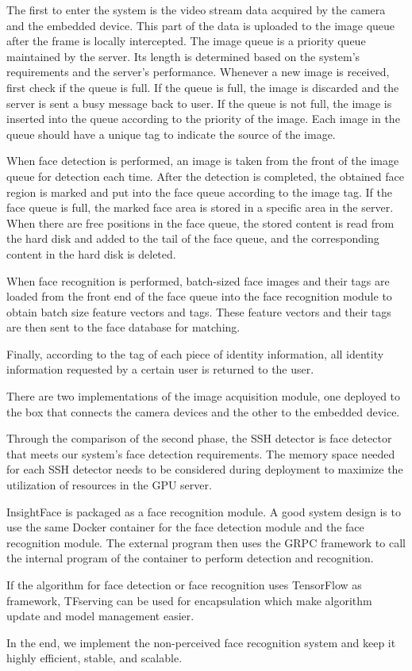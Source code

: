 \begin{bigabstract}
The first to enter the system is the video stream data acquired by the camera and the embedded device. This part of the data is uploaded to the image queue after the frame is locally intercepted. The image queue is a priority queue maintained by the server. Its length is determined based on the system's requirements and the server's performance. Whenever a new image is received, first check if the queue is full. If the queue is full, the image is discarded and the server is sent a busy message back to user. If the queue is not full, the image is inserted into the queue according to the priority of the image. Each image in the queue should have a unique tag to indicate the source of the image.

When face detection is performed, an image is taken from the front of the image queue for detection each time. After the detection is completed, the obtained face region is marked and put into the face queue according to the image tag. If the face queue is full, the marked face area is stored in a specific area in the server. When there are free positions in the face queue, the stored content is read from the hard disk and added to the tail of the face queue, and the corresponding content in the hard disk is deleted.

When face recognition is performed, batch-sized face images and their tags are loaded from the front end of the face queue into the face recognition module to obtain batch size feature vectors and tags. These feature vectors and their tags are then sent to the face database for matching. 

Finally, according to the tag of each piece of identity information, all identity information requested by a certain user is returned to the user.

There are two implementations of the image acquisition module, one deployed to the box that connects the camera devices and the other to the embedded device. 

Through the comparison of the second phase, the SSH detector\cite{najibi2017ssh} is face detector that meets our system's face detection requirements. The memory space needed for each SSH detector needs to be considered during deployment to maximize the utilization of resources in the GPU server. 

InsightFace\cite{deng2018arcface} is packaged as a face recognition module. A good system design is to use the same Docker container for the face detection module and the face recognition module. The external program then uses the GRPC framework to call the internal program of the container to perform detection and recognition.

If the algorithm for face detection or face recognition uses TensorFlow as framework, TFserving can be used for encapsulation which make algorithm update and model management easier.

In the end, we implement the non-perceived face recognition system and keep it highly efficient, stable, and scalable.


\end{bigabstract}